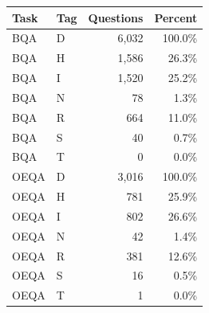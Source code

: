 \begin{tabular}{llrr}
\toprule
Task & Tag & Questions & Percent \\
\midrule
BQA & D & 6,032 & 100.0\% \\
BQA & H & 1,586 & 26.3\% \\
BQA & I & 1,520 & 25.2\% \\
BQA & N & 78 & 1.3\% \\
BQA & R & 664 & 11.0\% \\
BQA & S & 40 & 0.7\% \\
BQA & T & 0 & 0.0\% \\
OEQA & D & 3,016 & 100.0\% \\
OEQA & H & 781 & 25.9\% \\
OEQA & I & 802 & 26.6\% \\
OEQA & N & 42 & 1.4\% \\
OEQA & R & 381 & 12.6\% \\
OEQA & S & 16 & 0.5\% \\
OEQA & T & 1 & 0.0\% \\
\bottomrule
\end{tabular}
